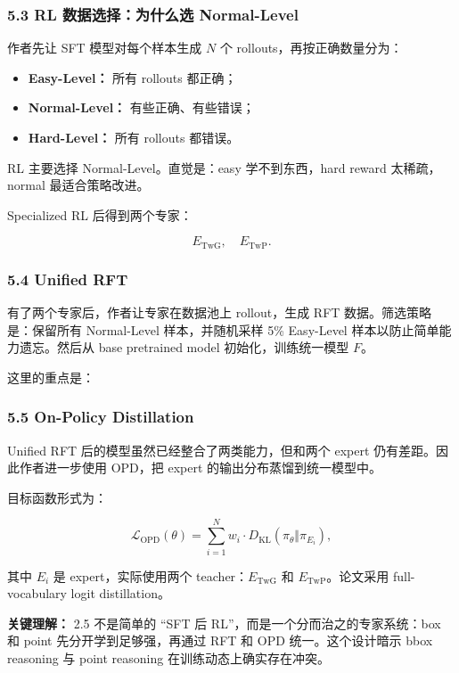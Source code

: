 \subsubsection{5.3 RL 数据选择：为什么选 Normal-Level}

作者先让 SFT 模型对每个样本生成 $N$ 个 rollouts，再按正确数量分为：

\begin{itemize}[leftmargin=1.5em]
  \item \textbf{Easy-Level：} 所有 rollouts 都正确；
  \item \textbf{Normal-Level：} 有些正确、有些错误；
  \item \textbf{Hard-Level：} 所有 rollouts 都错误。
\end{itemize}

RL 主要选择 Normal-Level。直觉是：easy 学不到东西，hard reward 太稀疏，normal 最适合策略改进。

Specialized RL 后得到两个专家：

\[
E_{\mathrm{TwG}},\quad E_{\mathrm{TwP}}.
\]

\subsubsection{5.4 Unified RFT}

有了两个专家后，作者让专家在数据池上 rollout，生成 RFT 数据。筛选策略是：保留所有 Normal-Level 样本，并随机采样 5\% Easy-Level 样本以防止简单能力遗忘。然后从 base pretrained model 初始化，训练统一模型 $F$。

这里的重点是：

\subsubsection{5.5 On-Policy Distillation}

Unified RFT 后的模型虽然已经整合了两类能力，但和两个 expert 仍有差距。因此作者进一步使用 OPD，把 expert 的输出分布蒸馏到统一模型中。

目标函数形式为：

\[
\mathcal{L}_{\mathrm{OPD}}(\theta)
=
\sum_{i=1}^{N}w_i\cdot D_{\mathrm{KL}}\left(\pi_\theta\Vert\pi_{E_i}\right),
\]

其中 $E_i$ 是 expert，实际使用两个 teacher：$E_{\mathrm{TwG}}$ 和 $E_{\mathrm{TwP}}$。论文采用 full-vocabulary logit distillation。

\begin{summarybox}
\textbf{关键理解：} 2.5 不是简单的 ``SFT 后 RL''，而是一个分而治之的专家系统：box 和 point 先分开学到足够强，再通过 RFT 和 OPD 统一。这个设计暗示 bbox reasoning 与 point reasoning 在训练动态上确实存在冲突。
\end{summarybox}

